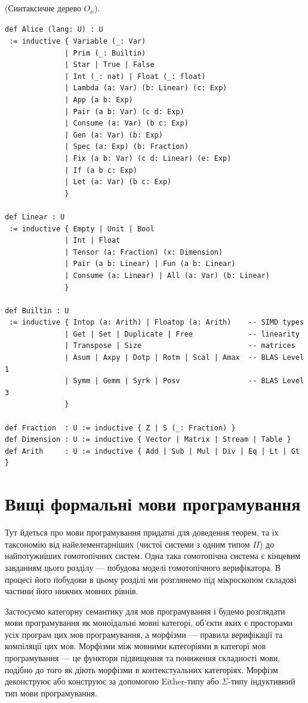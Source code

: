 \begin{definition} (Синтаксичне дерево $O_\mu$).
\begin{lstlisting}
def Alice (lang: U) : U
 := inductive { Variable (_: Var)
              | Prim (_: Builtin)
              | Star | True | False
              | Int (_: nat) | Float (_: float)
              | Lambda (a: Var) (b: Linear) (c: Exp)
              | App (a b: Exp)
              | Pair (a b: Var) (c d: Exp)
              | Consume (a: Var) (b c: Exp)
              | Gen (a: Var) (b: Exp)
              | Spec (a: Exp) (b: Fraction)
              | Fix (a b: Var) (c d: Linear) (e: Exp)
              | If (a b c: Exp)
              | Let (a: Var) (b c: Exp)
              }

def Linear : U
 := inductive { Empty | Unit | Bool
              | Int | Float
              | Tensor (a: Fraction) (x: Dimension)
              | Pair (a b: Linear) | Fun (a b: Linear)
              | Consume (a: Linear) | All (a: Var) (b: Linear)
              }

def Builtin : U
 := inductive { Intop (a: Arith) | Floatop (a: Arith)    -- SIMD types
              | Get | Set | Duplicate | Free             -- linearity
              | Transpose | Size                         -- matrices
              | Asum | Axpy | Dotp | Rotm | Scal | Amax  -- BLAS Level 1
              | Symm | Gemm | Syrk | Posv                -- BLAS Level 3
              }

def Fraction  : U := inductive { Z | S (_: Fraction) }
def Dimension : U := inductive { Vector | Matrix | Stream | Table }
def Arith     : U := inductive { Add | Sub | Mul | Div | Eq | Lt | Gt }

\end{lstlisting}
\end{definition}

\newpage
\section{Вищі формальні мови програмування}
Тут йдеться про мови програмування придатні для доведення теорем,
та їх таксономію від найелементарніших (чистої системи з одним типом $\Pi$) до
найпотужніших гомотопічних систем. Одна така гомотопічна система є кінцевим завданням
цього розділу --- побудова моделі гомотопічного верифікатора.
В процесі його побудови в цьому розділі ми розглянемо під
мікроскопом складові частини його нижчих мовних рівнів.

Застосуємо категорну семантику для мов програмування і будемо розглядати
мови програмування як моноїдальні мовні категорі, об'єкти яких є просторами
усіх програм цих мов програмування, а морфізми --- правила верифікації та компіляції цих мов.
Морфізми між мовними категоріями в категорї мов програмування --- це
функтори підвищення та пониження складності мови, подібно до того як діють
морфізми в контекстуальних категоріях. Морфізм деконструює або конструює за
допомогою Either-типу або $\Sigma$-типу індуктивний тип мови програмування.

